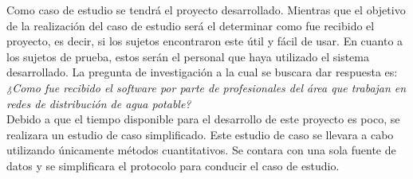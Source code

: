 \documentclass[11pt,letterpaper]{article}
\begin{document}
Como caso de estudio se tendrá el proyecto desarrollado. Mientras que el objetivo de la realización del caso de estudio será el determinar como fue recibido el proyecto, es decir, si los sujetos encontraron este útil y fácil de usar. En cuanto a los sujetos de prueba, estos serán el personal que haya utilizado el sistema desarrollado. La pregunta de investigación a la cual se buscara dar respuesta es:\\

\textit{¿Como fue recibido el software por parte de profesionales del área que trabajan en redes de distribución de agua potable?}\\

Debido a que el tiempo disponible para el desarrollo de este proyecto es poco, se realizara un estudio de caso simplificado. Este estudio de caso se llevara a cabo utilizando únicamente métodos cuantitativos. Se contara con una sola fuente de datos y se simplificara el protocolo para conducir el caso de estudio.



%
\end{document}
